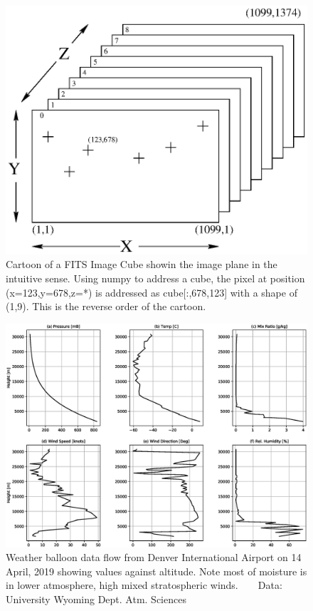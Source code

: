 \documentclass[letter,11pt,oneside]{article}
\begin{document}
\begin{figure}[h!]
\centering
\includegraphics[width=\textwidth]{images/CubeCartoon.eps}
\caption{Cartoon of a FITS Image Cube showin the image plane in the
  intuitive sense. Using numpy to address a cube, the pixel at
  position (x=123,y=678,z=*) is addressed as cube[:,678,123] with a
  shape of (1,9). This is the reverse order of the
  cartoon.} %
\label{figure:CubeCartoon}
\end{figure}

\begin{figure}[h!]
\centering
\includegraphics[width=\textwidth]{images/TypicalATM.eps}
\caption{Weather balloon data flow from Denver International Airport
  on 14 April, 2019 showing values against altitude. Note most of
  moisture is in lower atmosphere, high mixed stratospheric
  winds. ~ ~ \footnotesize{Data: University Wyoming Dept. Atm. Sciences}} %
\label{figure:WeatherPlot}
\end{figure}
\end{document}
